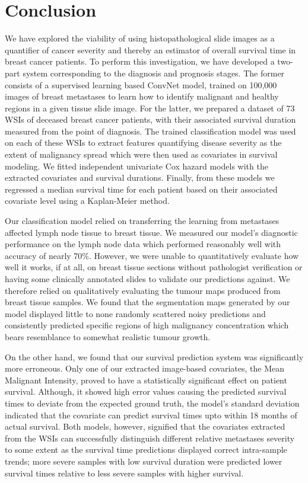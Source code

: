 \documentclass{l4proj}
\begin{document}
\chapter{Conclusion}    
We have explored the viability of using histopathological slide images as a quantifier of cancer severity and thereby an estimator of overall survival time in breast cancer patients. To perform this investigation, we have developed a two-part system corresponding to the diagnosis and prognosis stages. The former consists of a supervised learning based ConvNet model, trained on 100,000 images of breast metastases to learn how to identify malignant and healthy regions in a given tissue slide image. For the latter, we prepared a dataset of 73 WSIs of deceased breast cancer patients, with their associated survival duration measured from the point of diagnosis. The trained classification model was used on each of these WSIs to extract features quantifying disease severity as the extent of malignancy spread which were then used as covariates in survival modeling. We fitted independent univariate Cox hazard models with the extracted covariates and survival durations. Finally, from these models we regressed a median survival time for each patient based on their associated covariate level using a Kaplan-Meier method. 

Our classification model relied on transferring the learning from metastases affected lymph node tissue to breast tissue. We measured our model's diagnostic performance on the lymph node data which performed reasonably well with accuracy of nearly 70\%. However, we were unable to quantitatively evaluate how well it works, if at all, on breast tissue sections without pathologist verification or having some clinically annotated slides to validate our predictions against. We therefore relied on qualitatively evaluating the tumour maps produced from breast tissue samples. We found that the segmentation maps generated by our model displayed little to none randomly scattered noisy predictions and consistently predicted specific regions of high malignancy concentration which bears resemblance to somewhat realistic tumour growth. 

On the other hand, we found that our survival prediction system was significantly more erroneous. Only one of our extracted image-based covariates, the Mean Malignant Intensity, proved to have a statistically significant effect on patient survival. Although, it showed high error values causing the predicted survival times to deviate from the expected ground truth, the model's standard deviation indicated that the covariate can predict survival times upto within 18 months of actual survival. Both models, however, signified that the covariates extracted from the WSIs can successfully distinguish different relative metastases severity to some extent as the survival time predictions displayed correct intra-sample trends; more severe samples with low survival duration were predicted lower survival times relative to less severe samples with higher survival. 
\end{document}
